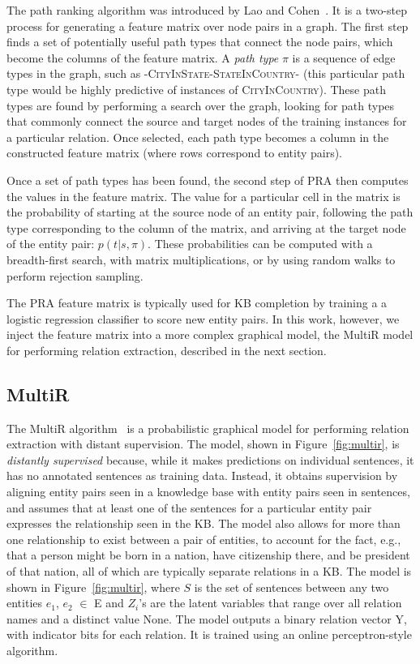 \documentclass[11pt,a4paper]{article}
\newcommand{\figref}[1]{Figure~\ref{fig:#1}}
\newcommand{\relation}[1]{\textsc{#1}}
\newcommand{\pathtype}{\ensuremath{\pi}}
\begin{document}
The path ranking algorithm was introduced by Lao and
Cohen~.  It is a two-step process for generating a
feature matrix over node pairs in a graph.  The first step finds a set of
potentially useful path types that connect the node pairs, which become the
columns of the feature matrix.  A \emph{path type} \pathtype{} is a sequence of
edge types in the graph, such as
-\relation{CityInState}-\relation{StateInCountry}- (this particular path type
would be highly predictive of instances of \relation{CityInCountry}).  These
path types are found by performing a search over the graph, looking for path
types that commonly connect the source and target nodes of the training
instances for a particular relation.  Once selected, each path type becomes a
column in the constructed feature matrix (where rows correspond to entity
pairs).

Once a set of path types has been found, the second step of PRA then computes
the values in the feature matrix.  The value for a particular cell in the
matrix is the probability of starting at the source node of an entity pair,
following the path type corresponding to the column of the matrix, and arriving
at the target node of the entity pair: $p(t|s,\pathtype)$.  These probabilities
can be computed with a breadth-first search, with matrix multiplications, or by
using random walks to perform rejection sampling.

The PRA feature matrix is typically used for KB completion by training a a
logistic regression classifier to score new entity pairs.  In this work,
however, we inject the feature matrix into a more complex graphical model, the
MultiR model for performing relation extraction, described in the next section.

\subsection{MultiR}

The MultiR algorithm~\cite{hoffmann-2011-distant-supervision} is a
probabilistic graphical model for performing relation extraction with distant
supervision.  The model, shown in \figref{multir}, is \emph{distantly
supervised} because, while it makes predictions on individual sentences, it has
no annotated sentences as training data.  Instead, it obtains supervision by
aligning entity pairs seen in a knowledge base with entity pairs seen in
sentences, and assumes that at least one of the sentences for a particular
entity pair expresses the relationship seen in the KB.  The model also allows
for more than one relationship to exist between a pair of entities, to account
for the fact, e.g., that a person might be born in a nation, have citizenship
there, and be president of that nation, all of which are typically separate
relations in a KB.  The model is shown in \figref{multir}, where $S$ is the set
of sentences between any two entities $e_1$, $e_2$ $\in$ E and $Z_i$'s are the
latent variables that range over all relation names and a distinct value None.
The model outputs a binary relation vector Y, with indicator bits for each
relation.  It is trained using an online perceptron-style algorithm.
\end{document}
